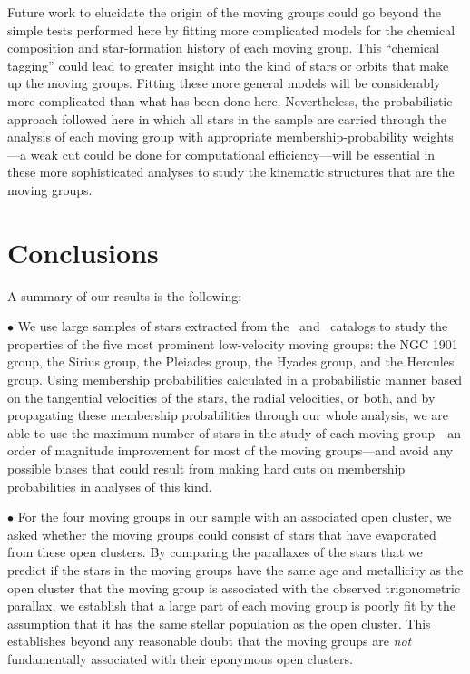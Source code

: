 Future work to elucidate the origin of the moving groups could go
beyond the simple tests performed here by fitting more complicated
models for the chemical composition and star-formation history of each
moving group. This ``chemical tagging'' \citep{Freeman02a} could lead
to greater insight into the kind of stars or orbits that make up the
moving groups. Fitting these more general models will be considerably
more complicated than what has been done here. Nevertheless, the
probabilistic approach followed here in which all stars in the sample
are carried through the analysis of each moving group with appropriate
membership-probability weights---a weak cut could be done for
computational efficiency---will be essential in these more
sophisticated analyses to study the kinematic structures that are the
moving groups.

\section{Conclusions}

A summary of our results is the following:

$\bullet$ We use large samples of stars extracted from the
\Hipparcos\ and \gcsabb\ catalogs to study the properties of the five
most prominent low-velocity moving groups: the NGC 1901 group, the
Sirius group, the Pleiades group, the Hyades group, and the Hercules
group. Using membership probabilities calculated in a probabilistic
manner based on the tangential velocities of the stars, the radial
velocities, or both, and by propagating these membership probabilities
through our whole analysis, we are able to use the maximum number of
stars in the study of each moving group---an order of magnitude
improvement for most of the moving groups---and avoid any possible
biases that could result from making hard cuts on membership
probabilities in analyses of this kind.

$\bullet$ For the four moving groups in our sample with an associated
open cluster, we asked whether the moving groups could consist of
stars that have evaporated from these open clusters. By comparing the
parallaxes of the stars that we predict if the stars in the moving
groups have the same age and metallicity as the open cluster that the
moving group is associated with the observed trigonometric parallax,
we establish that a large part of each moving group is poorly fit by
the assumption that it has the same stellar population as the open
cluster. This establishes beyond any reasonable doubt that the moving
groups are \emph{not} fundamentally associated with their eponymous
open clusters.

